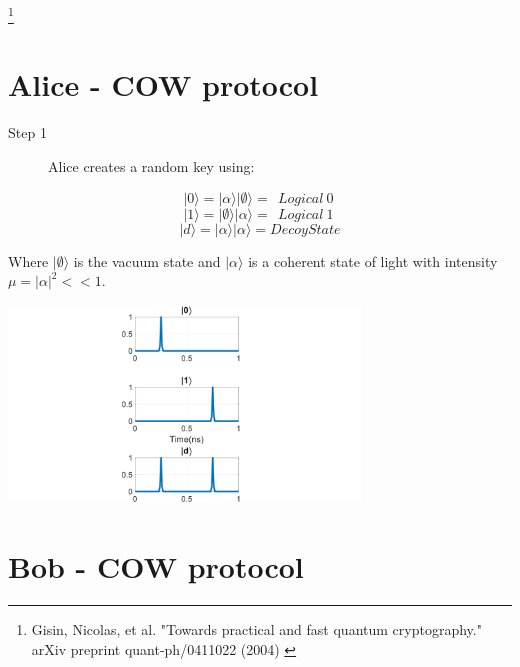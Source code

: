 \documentclass[1000pt]{article}
\newcommand{\mysection}[1]{\section*{\color{black}\sffamily #1}}%
\newcommand{\cref}[1]{{\fontsize{17pt}{0cm}\selectfont\color{black} #1}}%
\newcommand\blfootnote[1]{%
  \begingroup
  \renewcommand\thefootnote{}\footnote{#1}%
  \addtocounter{footnote}{-1}%
  \endgroup
}
\begin{document}
\blfootnote{
\hspace*{12cm}
\begin{minipage}{26cm}
\cref{
Gisin, Nicolas, et al. "Towards practical and fast quantum cryptography." arXiv preprint quant-ph/0411022 (2004)
}
\end{minipage}
}

\mysection{\Huge\textbf{Alice - COW protocol}} \Large \vspace*{1cm}
\begin{multicols}{2}
\begin{description}
  \item[Step 1] Alice creates a random key using:  
\end{description}
$$|0\rangle = |\alpha\rangle |\emptyset\rangle =\ \ Logical\ 0\ $$      
  $$|1\rangle = |\emptyset\rangle |\alpha\rangle =\ \ Logical\ 1\ $$
$$|d\rangle = |\alpha\rangle |\alpha\rangle = Decoy State$$

Where $|\emptyset\rangle$ is the vacuum state and $|\alpha\rangle$ is a coherent state of light with intensity $\mu=|\alpha|^2<<1$.

\columnbreak
    	\includegraphics[width=0.7\textwidth]{./figures/S1A.pdf}
\end{multicols}



\mysection{\Huge\textbf{Bob - COW protocol}} \Large \vspace*{1cm}
\end{document}
